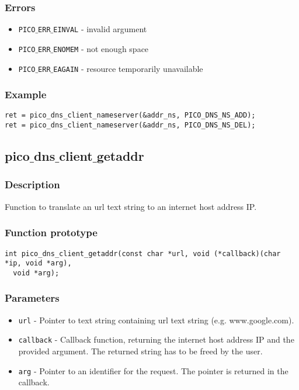 \subsubsection*{Errors}
\begin{itemize}[noitemsep]
\item \texttt{PICO$\_$ERR$\_$EINVAL} - invalid argument
\item \texttt{PICO$\_$ERR$\_$ENOMEM} - not enough space
\item \texttt{PICO$\_$ERR$\_$EAGAIN} - resource temporarily unavailable
\end{itemize}

\subsubsection*{Example}
\begin{verbatim}
ret = pico_dns_client_nameserver(&addr_ns, PICO_DNS_NS_ADD);
ret = pico_dns_client_nameserver(&addr_ns, PICO_DNS_NS_DEL);
\end{verbatim}



\subsection{pico$\_$dns$\_$client$\_$getaddr}

\subsubsection*{Description}
Function to translate an url text string to an internet host address IP. 

\subsubsection*{Function prototype}
\begin{verbatim}
int pico_dns_client_getaddr(const char *url, void (*callback)(char *ip, void *arg), 
  void *arg);
\end{verbatim}

\subsubsection*{Parameters}
\begin{itemize}[noitemsep]
\item \texttt{url} - Pointer to text string containing url text string (e.g. www.google.com).
\item \texttt{callback} - Callback function, returning the internet host address IP and the provided argument. The returned string has to be freed by the user.
\item \texttt{arg} - Pointer to an identifier for the request. The pointer is returned in the callback.
\end{itemize}

